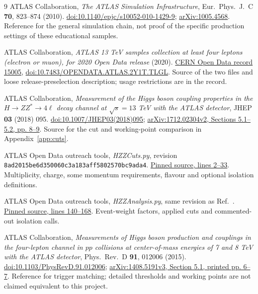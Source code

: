 \documentclass[11pt,a4paper]{article}
\begin{document}
\clearpage
\begingroup
\small
\renewcommand{\refname}{References}
\begin{thebibliography}{9}
ATLAS Collaboration, \emph{The ATLAS Simulation Infrastructure},
Eur.~Phys.~J.~C \textbf{70}, 823--874 (2010).
\href{https://doi.org/10.1140/epjc/s10052-010-1429-9}{doi:10.1140/epjc/s10052-010-1429-9};
\href{https://arxiv.org/abs/1005.4568}{arXiv:1005.4568}.
Reference for the general simulation chain, not proof of the specific production settings of these educational samples.

ATLAS Collaboration, \emph{ATLAS 13 TeV samples collection at least four leptons
(electron or muon), for 2020 Open Data release} (2020).
\href{https://opendata.cern.ch/record/15005}{CERN Open Data record 15005},
\href{https://doi.org/10.7483/OPENDATA.ATLAS.2Y1T.TLGL}{doi:10.7483/OPENDATA.ATLAS.2Y1T.TLGL}.
Source of the two files and loose release-preselection description; usage restrictions are in the record.

ATLAS Collaboration, \emph{Measurement of the Higgs boson coupling properties in
the $H\to ZZ^*\to4\ell$ decay channel at $\sqrt{s}=13$ TeV with the ATLAS detector},
JHEP \textbf{03} (2018) 095.
\href{https://doi.org/10.1007/JHEP03(2018)095}{doi:10.1007/JHEP03(2018)095};
\href{https://arxiv.org/pdf/1712.02304v2#page=8}{arXiv:1712.02304v2, Sections 5.1--5.2, pp. 8--9}.
Source for the cut and working-point comparison in Appendix~\ref{app:cuts}.

ATLAS Open Data outreach tools, \emph{HZZCuts.py}, revision
\nolinkurl{8ad2015be6d350060c3a183aff5802570bc9ada4}.
\href{https://github.com/atlas-outreach-data-tools/atlas-outreach-Python-uproot-framework-13tev/blob/8ad2015be6d350060c3a183aff5802570bc9ada4/HZZCuts.py#L2-L33}{Pinned source, lines 2--33}.
Multiplicity, charge, some momentum requirements, flavour and optional isolation definitions.

ATLAS Open Data outreach tools, \emph{HZZAnalysis.py}, same revision as Ref.~\cite{HZZCuts}.
\href{https://github.com/atlas-outreach-data-tools/atlas-outreach-Python-uproot-framework-13tev/blob/8ad2015be6d350060c3a183aff5802570bc9ada4/HZZAnalysis.py#L140-L168}{Pinned source, lines 140--168}.
Event-weight factors, applied cuts and commented-out isolation calls.

ATLAS Collaboration, \emph{Measurements of Higgs boson production and couplings
in the four-lepton channel in $pp$ collisions at center-of-mass energies of
7 and 8 TeV with the ATLAS detector}, Phys.~Rev.~D \textbf{91}, 012006 (2015).
\href{https://doi.org/10.1103/PhysRevD.91.012006}{doi:10.1103/PhysRevD.91.012006};
\href{https://arxiv.org/pdf/1408.5191v3#page=7}{arXiv:1408.5191v3, Section 5.1, printed pp. 6--7}.
Reference for trigger matching; detailed thresholds and working points are not claimed equivalent to this project.


\end{thebibliography}
\end{document}
